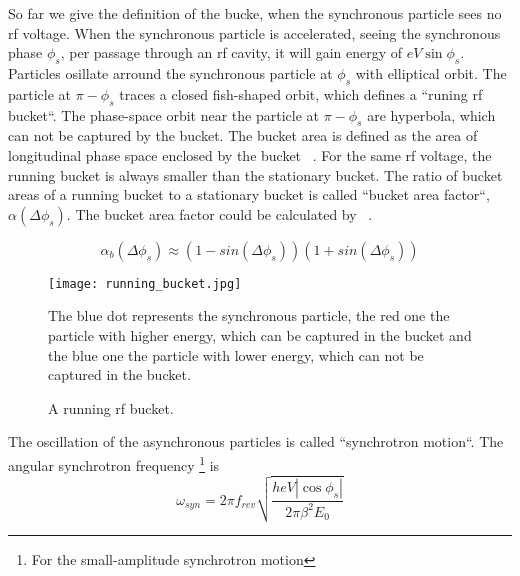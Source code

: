 So far we give the definition of the bucke, when the synchronous particle sees no rf voltage. When the synchronous particle is accelerated, seeing the synchronous phase $\phi_{\mathit{s}}$, per passage through an rf cavity, it will gain energy of $eV\sin\phi_{\mathit{s}}$. %
Particles osillate arround the synchronous particle at $\phi_{\mathit{s}}$ with elliptical orbit. The particle at $\pi-\phi_{\mathit{s}}$ traces a closed fish-shaped orbit, which defines a ``runing rf bucket``. The phase-space orbit near the particle at $\pi-\phi_{\mathit{s}}$ are hyperbola, which can not be captured by the bucket. The bucket area is defined as the area of longitudinal phase space enclosed by the bucket ~\cite{lee_accelerator_2011}. For the same rf voltage, the running
bucket is always smaller than the stationary bucket. The ratio of bucket areas of a running bucket to a stationary bucket is called ``bucket area factor``, $\alpha(\Delta \phi_s)$. The bucket area factor could be calculated by ~\cite{lee_accelerator_2011}.

\begin{equation}
\alpha_b(\Delta\phi_s)\approx(1-sin(\Delta \phi_s))(1+sin(\Delta \phi_s))
\label{eq:buckt_area_factor}
\end{equation} 

\begin{figure}[!htb]
   \centering   
   \texttt{[image: running\_bucket.jpg]}
   \caption{A running rf bucket.}{The blue dot represents the synchronous particle, the red one the particle with higher energy, which can be captured in the bucket and the blue one the particle with lower energy, which can not be captured in the bucket.}
   \label{running_bucket}
\end{figure} 

The oscillation of the asynchronous particles is called ``synchrotron motion``. The angular synchrotron frequency \footnote{For the small-amplitude synchrotron motion} is ~\cite{lee_accelerator_2011}
\begin{equation}
\omega_{\mathit{syn}}=2\pi f_{\mathit{rev}}\sqrt{\frac{heV|\cos\phi_s|}{2\pi\beta^2E_0}}
\label{eq:synchfreq}
\end{equation} 

